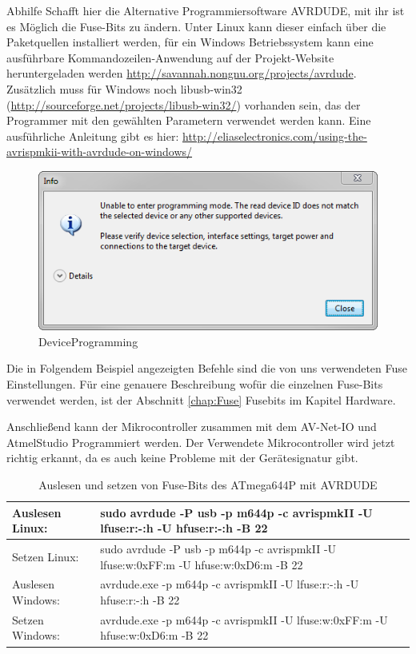Abhilfe Schafft hier die Alternative Programmiersoftware AVRDUDE, mit ihr ist
es Möglich die Fuse-Bits zu ändern. Unter Linux kann dieser einfach über die
Paketquellen installiert werden, für ein Windows Betriebssystem kann eine
ausführbare Kommandozeilen-Anwendung auf der Projekt-Website heruntergeladen
werden \url{http://savannah.nongnu.org/projects/avrdude}. Zusätzlich muss für
Windows noch libusb-win32 (\url{http://sourceforge.net/projects/libusb-win32/})
vorhanden sein, das der Programmer mit den gewählten Parametern verwendet werden
kann. Eine ausführliche Anleitung gibt es hier:
\url{http://eliaselectronics.com/using-the-avrispmkii-with-avrdude-on-windows/}

\begin{figure}[H]
\centering
\includegraphics[width=13cm]{content/pictures/Anleitung/neuerProzessor/AnleitungNeuerProzessor2_fehler.png}
\caption{DeviceProgramming}
\label{Einrichten.error}
\end{figure}

Die in Folgendem Beispiel angezeigten Befehle sind die von uns verwendeten Fuse
Einstellungen. Für eine genauere Beschreibung wofür die einzelnen Fuse-Bits
verwendet werden, ist der Abschnitt \ref{chap:Fuse} Fusebits im Kapitel 
Hardware.

Anschließend kann der Mikrocontroller zusammen mit dem AV-Net-IO und AtmelStudio
Programmiert werden. Der Verwendete Mikrocontroller wird jetzt richtig erkannt,
da es auch keine Probleme mit der Gerätesignatur gibt.

\begin{table}[H]
\begin{tabular}{| p{} | p{} |}
\hline
Auslesen Linux:& sudo avrdude -P usb -p m644p -c avrispmkII  -U lfuse:r:-:h -U hfuse:r:-:h -B 22 \\ \hline
Setzen Linux:& sudo avrdude -P usb -p m644p -c avrispmkII -U lfuse:w:0xFF:m -U hfuse:w:0xD6:m -B 22 \\ \hline
Auslesen Windows:& avrdude.exe -p m644p -c avrispmkII -U lfuse:r:-:h -U hfuse:r:-:h -B 22 \\ \hline 
Setzen Windows:& avrdude.exe -p m644p -c avrispmkII -U lfuse:w:0xFF:m -U hfuse:w:0xD6:m -B 22 \\ \hline
\end{tabular}
\caption{Auslesen und setzen von Fuse-Bits des ATmega644P mit AVRDUDE}
\label{ParameterAvrdude1}
\end{table}

